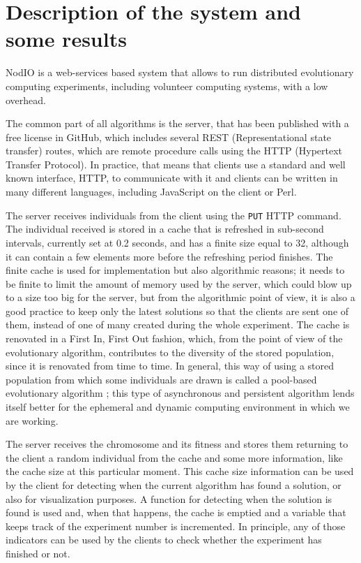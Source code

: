\documentclass{sig-alternate}
\begin{document}
\section{Description of the system and some results}
\label{sec:res}

NodIO \cite{2016arXiv160101607M,DBLP:conf/gecco/GuervosG15} is a
web-services based system that allows to run distributed evolutionary
computing experiments, including volunteer computing systems, with a
low overhead. 

The common part of all algorithms is the server, that has been
published with a free license in GitHub, which includes several REST
(Representational state transfer)
routes, which are remote procedure calls using the HTTP (Hypertext
Transfer Protocol). In practice, that means that clients use a
standard and well known interface, HTTP, to communicate with it and
clients can be written in many different languages, including
JavaScript on the client  or Perl. 

The server receives individuals from the client using the {\tt PUT}
HTTP command. The individual received is stored in a cache that is
refreshed in sub-second intervals, currently set at 0.2 seconds, and
has a finite size equal to 32, although it can contain a few elements
more before the refreshing period finishes. The finite cache is used
for implementation but also algorithmic reasons; it needs to be finite
to limit the amount of memory used by the server, which could blow up
to a size too big for the server, but from the algorithmic point of
view, it is also  a good practice to keep only the latest solutions so
that the clients are sent one of them, instead of one of many created
during the whole experiment. 
The cache is renovated in a First
In, First Out fashion, which, from the point of view of the
evolutionary algorithm, contributes to the diversity of the stored
population, since it is renovated from time to time. In general, this way of using a stored population from
which some individuals are drawn is called a pool-based evolutionary
algorithm
\cite{pool:ga,bollini1999distributed,gong2015distributed,
  sofea:evopar2012,DBLP:journals/grid/ValdezTGVO15,garcia2014unreliable,LNCS86720702,
  DBLP:conf/3pgcic/GuervosMFEL12,sofea:naco}; this type of
asynchronous and persistent algorithm lends itself better for the
ephemeral and dynamic computing environment in which we are
working. 

The server receives the chromosome and its fitness and
 stores them returning to the client a random individual from the
cache and some more information, like the cache size at this
particular moment. This cache size information can be used by the
client for detecting when the current algorithm has found a solution,
or also for visualization purposes. A function for detecting when the
solution is found is used and, when that happens, the cache is emptied
and a variable that keeps track of the experiment number is
incremented. In principle, any of those indicators can be used by the
clients to check whether the experiment has finished or not. 
\end{document}
